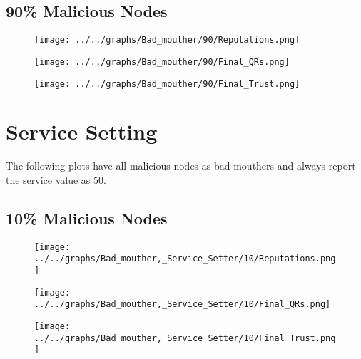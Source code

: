 \begin{minipage}[t]{0.49\columnwidth}
\subsection*{90\% Malicious Nodes}
    \begin{figure}[H]
        \centering
        \texttt{[image: ../../graphs/Bad\_mouther/90/Reputations.png]}
    \end{figure}
    \begin{figure}[H]
        \centering
        \texttt{[image: ../../graphs/Bad\_mouther/90/Final\_QRs.png]}
    \end{figure}
\end{minipage}
\begin{minipage}[t]{0.49\columnwidth}
    \begin{figure}[H]
        \centering
        \texttt{[image: ../../graphs/Bad\_mouther/90/Final\_Trust.png]}
    \end{figure}
\end{minipage}
\newpage

\section*{Service Setting}
The following plots have all malicious nodes as bad mouthers and always
report the service value as 50.
\\
\begin{minipage}[t]{0.49\columnwidth}
\subsection*{10\% Malicious Nodes}
    \begin{figure}[H]
        \centering
        \texttt{[image: ../../graphs/Bad\_mouther,\_Service\_Setter/10/Reputations.png]}
    \end{figure}
    \begin{figure}[H]
        \centering
        \texttt{[image: ../../graphs/Bad\_mouther,\_Service\_Setter/10/Final\_QRs.png]}
    \end{figure}
\end{minipage}
\begin{minipage}[t]{0.49\columnwidth}
    \begin{figure}[H]
        \centering
        \texttt{[image: ../../graphs/Bad\_mouther,\_Service\_Setter/10/Final\_Trust.png]}
    \end{figure}
\end{minipage}

